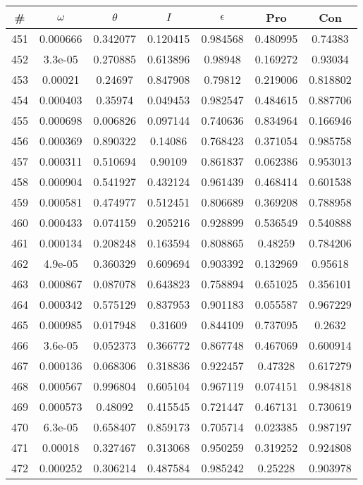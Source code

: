 \newpage
\begin{table}
\begin{tabular}{c|c|c|c|c|c|c}
\# & $\omega$ & $\theta$ & $I$ & $\epsilon$ & Pro & Con\\
\hline
451 & 0.000666 & 0.342077 & 0.120415 & 0.984568 & 0.480995 & 0.74383\\
452 & 3.3e-05 & 0.270885 & 0.613896 & 0.98948 & 0.169272 & 0.93034\\
453 & 0.00021 & 0.24697 & 0.847908 & 0.79812 & 0.219006 & 0.818802\\
454 & 0.000403 & 0.35974 & 0.049453 & 0.982547 & 0.484615 & 0.887706\\
455 & 0.000698 & 0.006826 & 0.097144 & 0.740636 & 0.834964 & 0.166946\\
456 & 0.000369 & 0.890322 & 0.14086 & 0.768423 & 0.371054 & 0.985758\\
457 & 0.000311 & 0.510694 & 0.90109 & 0.861837 & 0.062386 & 0.953013\\
458 & 0.000904 & 0.541927 & 0.432124 & 0.961439 & 0.468414 & 0.601538\\
459 & 0.000581 & 0.474977 & 0.512451 & 0.806689 & 0.369208 & 0.788958\\
460 & 0.000433 & 0.074159 & 0.205216 & 0.928899 & 0.536549 & 0.540888\\
461 & 0.000134 & 0.208248 & 0.163594 & 0.808865 & 0.48259 & 0.784206\\
462 & 4.9e-05 & 0.360329 & 0.609694 & 0.903392 & 0.132969 & 0.95618\\
463 & 0.000867 & 0.087078 & 0.643823 & 0.758894 & 0.651025 & 0.356101\\
464 & 0.000342 & 0.575129 & 0.837953 & 0.901183 & 0.055587 & 0.967229\\
465 & 0.000985 & 0.017948 & 0.31609 & 0.844109 & 0.737095 & 0.2632\\
466 & 3.6e-05 & 0.052373 & 0.366772 & 0.867748 & 0.467069 & 0.600914\\
467 & 0.000136 & 0.068306 & 0.318836 & 0.922457 & 0.47328 & 0.617279\\
468 & 0.000567 & 0.996804 & 0.605104 & 0.967119 & 0.074151 & 0.984818\\
469 & 0.000573 & 0.48092 & 0.415545 & 0.721447 & 0.467131 & 0.730619\\
470 & 6.3e-05 & 0.658407 & 0.859173 & 0.705714 & 0.023385 & 0.987197\\
471 & 0.00018 & 0.327467 & 0.313068 & 0.950259 & 0.319252 & 0.924808\\
472 & 0.000252 & 0.306214 & 0.487584 & 0.985242 & 0.25228 & 0.903978\\

\end{tabular}
\end{table}
